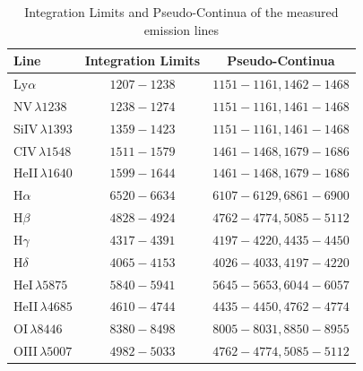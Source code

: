 \begin{table}[h!]
	\centering
	\small
	\caption{Integration Limits and Pseudo-Continua of the measured emission lines}
	\label{tab:emission_lines}
	\begin{tabular}{lcc}
		\hline
		\hline
		\textbf{Line} & \textbf{Integration Limits} & \textbf{Pseudo-Continua}  \\
		\hline
		Ly$\alpha$ & $1207-1238$ & $1151-1161, 1462-1468$\\
		NV$\,\lambda 1238$ & $1238-1274$ & $1151-1161, 1461-1468$ \\
		SiIV$\,\lambda 1393$ & $1359-1423$ & $1151-1161, 1461-1468$ \\
		CIV$\,\lambda 1548$ & $1511-1579$ & $1461-1468, 1679-1686$ \\
		HeII$\,\lambda 1640$& $1599-1644$ & $1461-1468, 1679-1686$ \\
		\hline
		H$\alpha$ & $6520-6634$ & $6107-6129, 6861-6900$ \\
		H$\beta$ & $4828-4924$ & $4762-4774, 5085-5112$ \\
		H$\gamma$ & $4317-4391$ & $4197-4220, 4435-4450$ \\
		H$\delta$ & $4065-4153$ & $4026-4033, 4197-4220$ \\
		
		HeI$\,\lambda5875$ & $5840-5941$ & $5645-5653, 6044-6057$ \\
		HeII$\,\lambda4685$ & $4610-4744$ & $4435-4450, 4762-4774$ \\
		OI$\,\lambda 8446$ & $8380-8498$ & $8005-8031, 8850-8955$ \\
		\hline
		OIII$\,\lambda 5007$ & $4982-5033$ & $4762-4774, 5085-5112$ \\
		\hline
		\hline
	\end{tabular}
\end{table}

